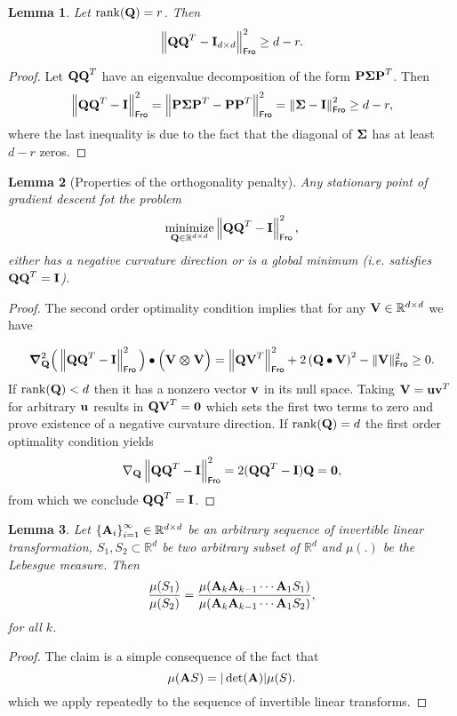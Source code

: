 \documentclass[11pt]{article}
\theoremstyle{plain}
\newtheorem{lemma}{Lemma}
\DeclareMathOperator*{\minimize}{minimize}
\DeclareMathOperator*{\rank}{rank}
\def\R{\mathbb{R}}
\theoremstyle{plain}
\numberwithin{equation}{section}
\numberwithin{lemma}{section}
\numberwithin{theorem}{section}
\numberwithin{corollary}{section}
\numberwithin{observation}{section}
\numberwithin{definition}{section}
\numberwithin{example}{section}
\begin{document}
\begin{lemma} \label{lem:qq_lb} Let $\rank(\Mx{Q}) = r$. Then
\[
\left\|\Mx{QQ}^T - \Mx{I}_{d \times d} \right\|_{\sf Fro}^2 \geq d-r.
\]
\end{lemma}
\begin{proof}
Let $\Mx{QQ}^T$ have an eigenvalue decomposition of the form $\Mx{P \Sigma P}^T$. Then
\[
\left\|\Mx{QQ}^T - \Mx{I} \right\|_{\sf Fro}^2 = \left\|\Mx{P \Sigma P}^T - \Mx{PP}^T \right\|_{\sf Fro}^2 = \left\|\Mx{\Sigma}- \Mx{I}\right\|_{\sf Fro}^2 \geq d-r,
\]
where the last inequality is due to the fact that the diagonal of $\Mx{\Sigma}$ has at least $d-r$ zeros.
\end{proof}

\begin{lemma}[Properties of the orthogonality penalty] \label{lem:orthogonal_penalty} Any stationary point of gradient descent fot the problem
\[
\minimize_{\Mx{Q} \in \R^{d\times d}} \left\|\Mx{QQ}^T - \Mx{I} \right\|_{\sf Fro}^2,
\]
either has a negative curvature direction or is a global minimum (i.e. satisfies $\Mx{QQ}^T = \Mx{I}$).
\end{lemma}
\begin{proof}
The second order optimality condition implies that for any $\Mx{V} \in \R^{d\times d} $ we have

\begin{align}
    \Mx{\nabla}^2_{\Mx{Q}}\Big(\left\|\Mx{QQ}^T - \Mx{I} \right\|_{\sf Fro}^2 \Big) \bullet \Big( \Mx{V \otimes V} \Big) = \left\|\Mx{QV}^T \right\|_{
    \sf Fro}^2+ 2\left(\Mx{Q}\bullet \Mx{V}\right)^2 - \|\Mx{V}\|_{\sf Fro}^2 \geq 0. 
\end{align}
If $\rank(\Mx{Q}) < d $ then it has a nonzero vector $\V{v}$ in its null space. Taking $\Mx{V} = \V{uv}^T$ for arbitrary $\V{u}$ results in $\Mx{QV}^T = \Mx{0}$ which sets the first two terms to zero and prove existence of a negative curvature direction. 
If $\rank(\Mx{Q}) = d$ the first order optimality condition yields
\[\nabla_{\Mx{Q}} \left\|\Mx{QQ}^T - \Mx{I} \right\|_{\sf Fro}^2= 2(\Mx{QQ}^T-\Mx{I})\Mx{Q}=\Mx{0},
\]
from which we conclude $\Mx{QQ}^T = \Mx{I}$.
\end{proof}




\begin{lemma} \label{lem:lin_det}
Let $\left\{\Mx{A}_i\right\}_{i = 1}^\infty \in \R^{d \times d}$ be an arbitrary sequence of invertible linear transformation, $S_1, S_2 \subset \R^{d}$ be two arbitrary subset of $\R^d$ and $\mu(.)$  be the Lebesgue measure. Then
\[
\frac{\mu(S_1)}{\mu(S_2)} = \frac{\mu(\Mx{A}_k\Mx{A}_{k-1} \cdots \Mx{A}_1 S_1)}{\mu(\Mx{A}_k\Mx{A}_{k-1} \cdots \Mx{A}_1S_2)},
\]
for all $k$.
\end{lemma}
\begin{proof} The claim is a simple consequence of the fact that 
\[
\mu(\Mx{A}S)= |\det(\Mx{A})|\mu(S).
\] 
which we apply repeatedly to the sequence of invertible linear transforms.\end{proof}
\end{document}
